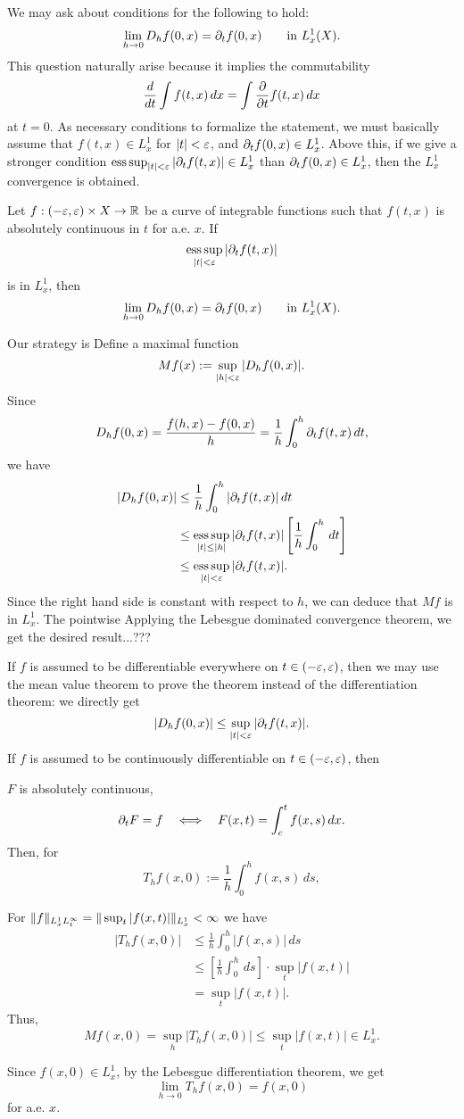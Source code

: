 \documentclass{../exp}
\begin{document}
We may ask about conditions for the following to hold:
\[\lim_{h\to0}D_hf(0,x)=\pd_tf(0,x)\qquad\text{in }L_x^1(X).\]
This question naturally arise because it implies the commutability
\[\dd{t}\int f(t,x)\,dx=\int\pd{t}f(t,x)\,dx\]
at $t=0$.
As necessary conditions to formalize the statement, we must basically assume that $f(t,x)\in L_x^1$ for $|t|<\varepsilon$, and $\pd_tf(0,x)\in L_x^1$.
Above this, if we give a stronger condition $\esssup_{|t|<\e}|\pd_tf(t,x)|\in L_x^1$ than $\pd_tf(0,x)\in L_x^1$, then the $L_x^1$ convergence is obtained.
\begin{thm}
Let $f:(-\e,\e)\times X\to\R$ be a curve of integrable functions such that $f(t,x)$ is absolutely continuous in $t$ for a.e. $x$.
If
\[\esssup_{|t|<\e}|\pd_tf(t,x)|\]
is in $L_x^1$, then
\[\lim_{h\to0}D_hf(0,x)=\pd_tf(0,x)\qquad\text{in }L_x^1(X).\]
\end{thm}
\begin{pf}
Our strategy is 
Define a maximal function
\[Mf(x):=\sup_{|h|<\varepsilon}|D_hf(0,x)|.\]
Since
\[D_hf(0,x)=\frac{f(h,x)-f(0,x)}h=\frac1h\int_0^h\pd_tf(t,x)\,dt,\]
we have
\begin{align*}
|D_hf(0,x)|&\le\frac1h\int_0^h|\pd_tf(t,x)|\,dt\\
&\le\esssup_{|t|\le|h|}|\pd_tf(t,x)|\left[\frac1h\int_0^h\,dt\right]\\
&\le\esssup_{|t|<\e}|\pd_tf(t,x)|.
\end{align*}
Since the right hand side is constant with respect to $h$, we can deduce that $Mf$ is in $L_x^1$.
The pointwise 
Applying the Lebesgue dominated convergence theorem, we get the desired result...???
\end{pf}
\begin{rmk}
If $f$ is assumed to be differentiable everywhere on $t\in(-\varepsilon,\varepsilon)$, then we may use the mean value theorem to prove the theorem instead of the differentiation theorem:
we directly get
\[|D_hf(0,x)|\le\sup_{|t|<\e}|\pd_tf(t,x)|.\]
If $f$ is assumed to be continuously differentiable on $t\in(-\varepsilon,\varepsilon)$, then 
\end{rmk}


$F$ is absolutely continuous,
\[\pd_tF=f\iff F(x,t)=\int_c^tf(x,s)\,dx.\]
Then, for
\[T_hf(x,0):=\frac1h\int_0^hf(x,s)\,ds,\]

For $\|f\|_{L_x^1L_t^\infty}=\|\sup_t|f(x,t)|\|_{L_x^1}<\infty$
we have
\begin{align*}
|T_hf(x,0)|&\le\frac1h\int_0^h|f(x,s)|\,ds\\
&\le\left[\frac1h\int_0^h\,ds\right]\cdot\sup_t|f(x,t)|\\
&=\sup_t|f(x,t)|.
\end{align*}
Thus,
\[Mf(x,0)=\sup_h|T_hf(x,0)|\le\sup_t|f(x,t)|\in L_x^1.\]

Since $f(x,0)\in L_x^1$, by the Lebesgue differentiation theorem, we get
\[\lim_{h\to0}T_hf(x,0)=f(x,0)\]
for a.e. $x$.
\end{document}
